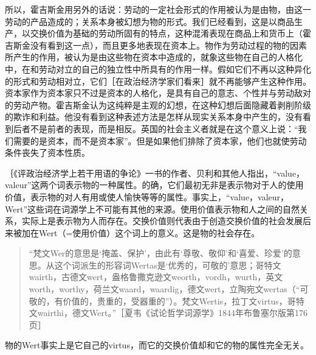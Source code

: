 所以，霍吉斯金用另外的话说：劳动的一定社会形式的作用被认为是由物，由这一劳动的产品造成的；关系本身被幻想为物的形式。我们已经看到，这是以商品生产，以交换价值为基础的劳动所固有的特点，这种混淆表现在商品上和货币上（霍吉斯金没有看到这一点），而且更多地表现在资本上。物作为劳动过程的物的因素所产生的作用，被认为是由这些物在资本中造成的，就象这些物在自己的人格化中，在和劳动对立的自己的独立性中所具有的作用一样。假如它们不再以这种异化的形式和劳动相对立，它们［在政治经济学家们看来］就不再能够产生这种作用。资本家作为资本家只不过是资本的人格化，是具有自己的意志、个性并与劳动敌对的劳动产物。霍吉斯金认为这纯粹是主观的幻想，在这种幻想后面隐藏着剥削阶级的欺诈和利益。他没有看到这种表述方法是怎样从现实关系本身中产生的，没有看到后者不是前者的表现，而是相反。英国的社会主义者就是在这个意义上说：“我们需要的是资本，而不是资本家”。但是如果他们排除了资本家，他们也就使劳动条件丧失了资本性质。


｛《评政治经济学上若干用语的争论》一书的作者、贝利和其他人指出，“value，valeur”这两个词表示物的一种属性。的确，它们最初无非是表示物对于人的使用价值，表示物的对人有用或使人愉快等等的属性。事实上，“value，valeur，Wert”这些词在词源学上不可能有其他的来源。使用价值表示物和人之间的自然关系，实际上是表示物为人而存在。交换价值则代表由于创造交换价值的社会发展后来被加在Wert（=使用价值）这个词上的意义。这是物的社会存在。

\begin{quote}{“梵文Wer的意思是‘掩盖、保护’，由此有‘尊敬、敬仰’和‘喜爱、珍爱’的意思。从这个词派生的形容词Wertas是‘优秀的，可敬的’意思；哥特文wairth，古德文wert，盎格鲁撒克逊文weorth，vordh，wurth，英文worth，worthy，荷兰文waard，waardig，德文wert，立陶宛文wertas（“可敬的，有价值的，贵重的，受器重的”）。梵文Wertis，拉丁文virtus，哥特文wairthi，德文Wert。”［夏韦《试论哲学词源学》1844年布鲁塞尔版第176页］}\end{quote}

物的Wert事实上是它自己的virtus，而它的交换价值却和它的物的属性完全无关。

